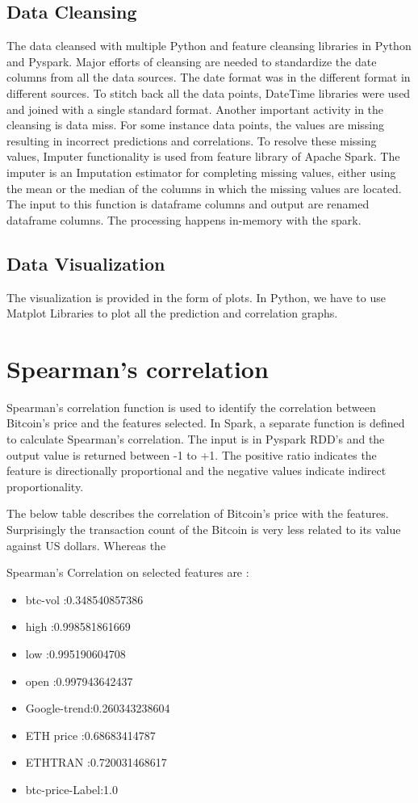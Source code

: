 \documentclass[sigconf]{acmart}
\begin{document}
\subsection{Data Cleansing}
The data cleansed with multiple Python and feature cleansing libraries in Python and Pyspark. Major efforts of cleansing are needed to standardize the date columns from all the data sources. The date format was in the different format in different sources. To stitch back all the data points, DateTime libraries were used and joined with a single standard format. Another important activity in the cleansing is data miss. For some instance data points, the values are missing resulting in incorrect predictions and correlations. To resolve these missing values, Imputer\cite{imputer:online} functionality is used from feature library of Apache Spark. The imputer is an Imputation estimator for completing missing values, either using the mean or the median of the columns in which the missing values are located. The input to this function is dataframe columns and output are renamed dataframe columns. The processing happens in-memory with the spark.

\subsection{Data Visualization}
The visualization is provided in the form of plots. In Python, we have to use Matplot Libraries to plot all the prediction and correlation graphs.


\section{Spearman's correlation}
Spearman's correlation function is used to identify the correlation between Bitcoin's price and the features selected. In Spark, a separate function is defined to calculate Spearman's correlation. The input is in Pyspark RDD's and the output value is returned between -1 to +1. The positive ratio indicates the feature is directionally proportional and the negative values indicate indirect proportionality.

The below table describes the correlation of Bitcoin's price with the features. Surprisingly the transaction count of the Bitcoin is very less related to its value against US dollars. Whereas the

Spearman's Correlation on selected features are :
\begin{itemize}
\item btc-vol     :0.348540857386 
\item high        :0.998581861669 
\item low         :0.995190604708 
\item open        :0.997943642437  
\item Google-trend:0.260343238604  
\item ETH price   :0.68683414787  
\item ETHTRAN     :0.720031468617
\item btc-price-Label:1.0 
\end{itemize}
\end{document}
